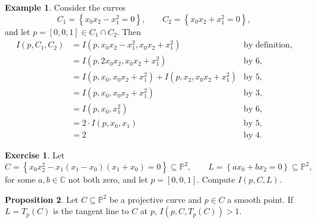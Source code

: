 \documentclass{article}
\newcommand{\C}{\mathbb{C}}
\renewcommand{\P}{\mathbb{P}}
\newcommand{\rb}[1]{\left( #1 \right)}
\renewcommand{\sb}[1]{\left[ #1 \right]}
\newcommand{\cb}[1]{\left\{ #1 \right\}}
\theoremstyle{definition}\newtheorem{definition}{Definition}[section]
\theoremstyle{definition}\newtheorem{notation}[definition]{Notation}
\theoremstyle{definition}\newtheorem{remark}[definition]{Remark}
\theoremstyle{definition}\newtheorem{example1}[definition]{Example}
\theoremstyle{definition}\newtheorem{fact}{Fact}
\theoremstyle{definition}\newtheorem{exercise}{Exercise}
\theoremstyle{definition}\newtheorem*{example2}{Example}
\newtheorem{proposition}[definition]{Proposition}
\begin{document}
\begin{example1}
Consider the curves
$$ C_1 = \cb{x_0x_2 - x_1^2 = 0}, \qquad C_2 = \cb{x_0x_2 + x_1^2 = 0}, $$
and let $ p = \sb{0, 0, 1} \in C_1 \cap C_2 $. Then
\begin{align*}
I\rb{p, C_1, C_2}
& = I\rb{p, x_0x_2 - x_1^2, x_0x_2 + x_1^2} & \text{by definition}, \\
& = I\rb{p, 2x_0x_2, x_0x_2 + x_1^2} & \text{by } 6, \\
& = I\rb{p, x_0, x_0x_2 + x_1^2} + I\rb{p, x_2, x_0x_2 + x_1^2} & \text{by } 5, \\
& = I\rb{p, x_0, x_0x_2 + x_1^2} & \text{by } 3, \\
& = I\rb{p, x_0, x_1^2} & \text{by } 6, \\
& = 2 \cdot I\rb{p, x_0, x_1} & \text{by } 5, \\
& = 2 & \text{by } 4.
\end{align*}
\end{example1}


\begin{exercise}
Let
$$ C = \cb{x_0x_2^2 - x_1\rb{x_1 - x_0}\rb{x_1 + x_0} = 0} \subseteq \P^2, \qquad L = \cb{ax_0 + bx_2 = 0} \subseteq \P^2, $$
for some $ a, b \in \C $ not both zero, and let $ p = \sb{0, 0, 1} $. Compute $ I\rb{p, C, L} $.
\end{exercise}

\begin{proposition}
Let $ C \subseteq \P^2 $ be a projective curve and $ p \in C $ a smooth point. If $ L = T_p\rb{C} $ is the tangent line to $ C $ at $ p $, $ I\rb{p, C, T_p\rb{C}} > 1 $.
\end{proposition}
\end{document}
